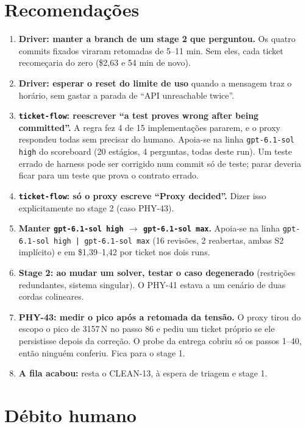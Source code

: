 \documentclass[11pt,a4paper]{article}
\begin{document}
\section{Recomendações}
\begin{enumerate}
  \item \textbf{Driver: manter a branch de um stage 2 que perguntou.} Os
        quatro commits fixados viraram retomadas de 5--11 min. Sem eles, cada
        ticket recomeçaria do zero (\$2,63 e 54 min de novo).
  \item \textbf{Driver: esperar o reset do limite de uso} quando a mensagem
        traz o horário, sem gastar a parada de ``API unreachable twice''.
  \item \textbf{\texttt{ticket-flow}: reescrever ``a test proves wrong after
        being committed''.} A regra fez 4 de 15 implementações pararem, e o
        proxy respondeu todas sem precisar do humano. Apoia-se na linha
        \texttt{gpt-6.1-sol high} do scoreboard (20 estágios, 4 perguntas,
        todas deste run). Um teste errado de harness pode ser corrigido num
        commit só de teste; parar deveria ficar para um teste que prova o
        contrato errado.
  \item \textbf{\texttt{ticket-flow}: só o proxy escreve ``Proxy decided''.}
        Dizer isso explicitamente no stage 2 (caso PHY-43).
  \item \textbf{Manter \texttt{gpt-6.1-sol high} $\to$ \texttt{gpt-6.1-sol
        max}.} Apoia-se na linha \texttt{gpt-6.1-sol high | gpt-6.1-sol max}
        (16 revisões, 2 reabertas, ambas S2 implícito) e em \$1,39--1,42 por
        ticket nos dois runs.
  \item \textbf{Stage 2: ao mudar um solver, testar o caso degenerado}
        (restrições redundantes, sistema singular). O PHY-41 estava a um
        cenário de duas cordas colineares.
  \item \textbf{PHY-43: medir o pico após a retomada da tensão.} O proxy
        tirou do escopo o pico de 3157\,N no passo 86 e pediu um ticket próprio
        se ele persistisse depois da correção. O probe da entrega cobriu só os
        passos 1--40, então ninguém conferiu. Fica para o stage 1.
  \item \textbf{A fila acabou:} resta o CLEAN-13, à espera de triagem e stage 1.
\end{enumerate}

\section{Débito humano}
\end{document}
